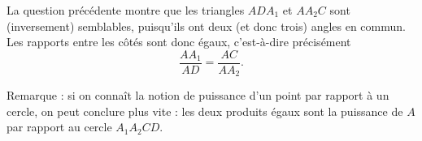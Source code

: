 \begin{exo}[Réflexion]
\begin{sol}
\begin{enumerate}
La question précédente montre que les triangles $ADA_1$ et $AA_2C$ sont (inversement) semblables, puisqu'ils ont deux (et donc trois) angles en commun. Les rapports entre les côtés sont donc égaux, c'est-à-dire précisément
\[ \frac{AA_1}{AD} = \frac{AC}{AA_2}.\]

Remarque : si on connaît la notion de puissance d'un point par rapport à un cercle, on peut conclure plus vite : les deux produits égaux sont la puissance de $A$ par rapport au cercle $A_1A_2CD$.
\end{enumerate}
\end{sol}
\end{exo}



\fin %



